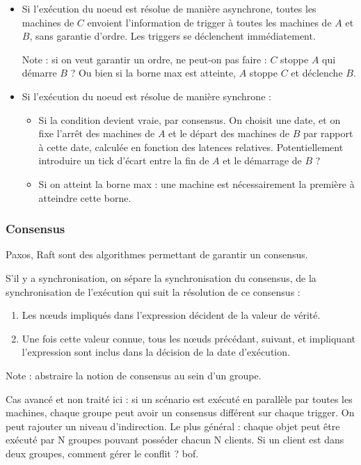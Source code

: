 \documentclass{article}
\begin{document}
\begin{itemize}
    \item Si l'exécution du noeud est résolue de manière asynchrone, toutes les machines de $C$ envoient l'information de trigger à toutes les machines de $A$ et $B$, sans garantie d'ordre. Les triggers se déclenchent immédiatement.
    
    Note : si on veut garantir un ordre, ne peut-on pas faire : $C$ stoppe $A$ qui démarre $B$ ? Ou bien si la borne max est atteinte, $A$ stoppe $C$ et déclenche $B$.
    
    \item Si l'exécution du noeud est résolue de manière synchrone : 
    \begin{itemize}
        \item Si la condition devient vraie, par consensus. On choisit une date, et on fixe l'arrêt des machines de $A$ et le départ des machines de $B$ par rapport à cette date, calculée en fonction des latences relatives. Potentiellement introduire un tick d'écart entre la fin de $A$ et le démarrage de $B$ ?
        \item Si on atteint la borne max : une machine est nécessairement la première à atteindre cette borne.
    \end{itemize}
\end{itemize}

\subsubsection{Consensus}
Paxos, Raft sont des algorithmes permettant de garantir un consensus.%

S'il y a synchronisation, on sépare la synchronisation du consensus, de la synchronisation de l'exécution qui suit la résolution de ce consensus : 
\begin{enumerate}
    \item Les n\oe uds impliqués dans l'expression décident de la valeur de vérité.
    \item Une fois cette valeur connue, tous les n\oe uds précédant, suivant, et impliquant l'expression sont inclus dans la décision de la date d'exécution.
\end{enumerate}

Note : abstraire la notion de consensus au sein d'un groupe.

Cas avancé et non traité ici : si un scénario est exécuté en parallèle par toutes les machines, chaque groupe peut avoir un consensus différent sur chaque trigger.
On peut rajouter un niveau d'indirection. Le plus général : chaque objet peut être exécuté par N groupes pouvant posséder chacun N clients.
Si un client est dans deux groupes, comment gérer le conflit ? bof.
\end{document}
